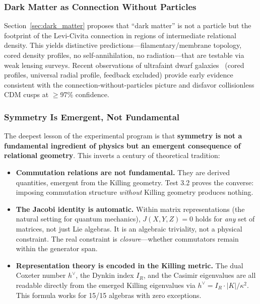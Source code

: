 \subsubsection{Dark Matter as Connection Without Particles}

Section~\ref{sec:dark_matter} proposes that ``dark matter'' is not a particle but the footprint of the Levi-Civita connection in regions of intermediate relational density. This yields distinctive predictions---filamentary/membrane topology, cored density profiles, no self-annihilation, no radiation---that are testable via weak lensing surveys. Recent observations of ultrafaint dwarf galaxies~\cite{SanchezAlmeitaTrujilloPlastino2024} (cored profiles, universal radial profile, feedback excluded) provide early evidence consistent with the connection-without-particles picture and disfavor collisionless CDM cusps at $\geq$97\% confidence.

\subsubsection{Symmetry Is Emergent, Not Fundamental}

The deepest lesson of the experimental program is that \textbf{symmetry is not a fundamental ingredient of physics but an emergent consequence of relational geometry}. This inverts a century of theoretical tradition:

\begin{itemize}
\item \textbf{Commutation relations are not fundamental.} They are derived quantities, emergent from the Killing geometry. Test 3.2 proves the converse: imposing commutation structure \textit{without} Killing geometry produces nothing.

\item \textbf{The Jacobi identity is automatic.} Within matrix representations (the natural setting for quantum mechanics), $J(X,Y,Z) = 0$ holds for \textit{any} set of matrices, not just Lie algebras. It is an algebraic triviality, not a physical constraint. The real constraint is \textit{closure}---whether commutators remain within the generator span.

\item \textbf{Representation theory is encoded in the Killing metric.} The dual Coxeter number $h^\vee$, the Dynkin index $I_R$, and the Casimir eigenvalues are all readable directly from the emerged Killing eigenvalues via $h^\vee = I_R \cdot |K|/\kappa^2$. This formula works for 15/15 algebras with zero exceptions.
\end{itemize}

